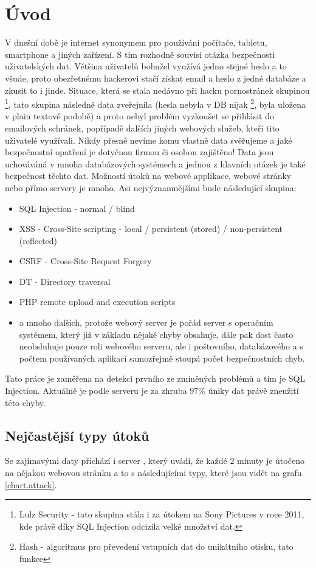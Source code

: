\documentclass[12pt, a4paper]{report}
\begin{document}
\chapter{Úvod}
V dnešní době je internet synonymem pro používání počítače, tabletu, smartphone a jiných zařízení. S tím rozhodně souvisí otázka bezpečnosti uživatelských dat. Většina uživatelů bohužel využívá jedno stejné heslo a to všude, proto obezřetnému hackerovi stačí získat email a heslo z jedné databáze a zkusit to i jinde. Situace, která se stala nedávno při hacku pornostránek skupinou \footnote{Lulz Security - tato skupina stála i za útokem na Sony Pictures v roce 2011, kde právě díky SQL Injection odcizila velké množství dat.}, tato skupina následně data zveřejnila (hesla nebyla v DB nijak \footnote{Hash - algoritmus pro převedení vstupních dat do unikátního otisku, tato funkce }, byla uložena v plain textové podobě) a proto nebyl problém vyzkoušet se přihlásit do emailových schránek, popřípadě dalších jiných webových služeb, kteří tito uživatelé využívali. Nikdy přesně nevíme komu vlastně  data svěřujeme a jaké bezpečnostní opatření je dotyčnou firmou či osobou zajištěno! Data jsou uchováváná v mnoha databázových systémech a jednou z hlavních otázek je také bezpečnost těchto dat. Možností útoků na webové applikace, webové stránky nebo přímo servery je mnoho.  Asi nejvýznamnějšími bude následující skupina:
\begin{itemize}
\item SQL Injection - normal / blind
\item XSS - Cross-Site scripting - local / persistent (stored) / non-persistent (reflected)
\item CSRF - Cross-Site Request Forgery 
\item DT - Directory traversal
\item PHP remote upload and execution scripts
\item a mnoho dalších, protože webový server je pořád server s operačním systémem, který již v základu nějaké chyby obsahuje, dále pak dost často neobsluhuje pouze roli webového serveru, ale i poštovního, databázového a s počtem používaných aplikací samozřejmě stoupá počet bezpečnostních chyb.
\end{itemize}
Tato práce je zaměřena na detekci prvního ze zmíněných problémů a tím je SQL Injection. Aktuálně je podle serveru  je za zhruba 97\% úniky dat právě zneužití této chyby. 

\section{Nejčastější typy útoků}
Se zajímavými daty přichází i server , který uvádí, že každé 2 minuty je útočeno na nějakou webovou stránku a to s následujícími typy, které jsou vidět na grafu \ref{chart.attack}.
\end{document}
